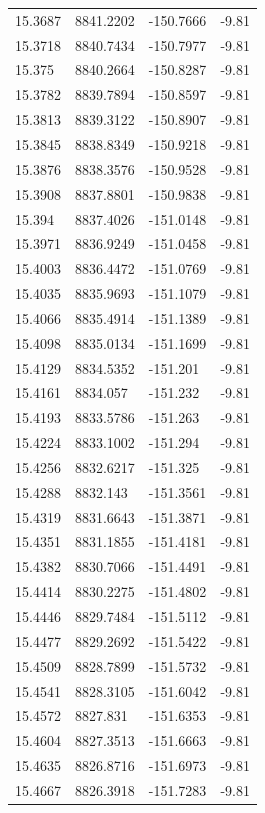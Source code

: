 \begin{table}[H]
\begin{tabular}{llll}
15.3687 & 8841.2202 & -150.7666 & -9.81 \\
15.3718 & 8840.7434 & -150.7977 & -9.81 \\
15.375 & 8840.2664 & -150.8287 & -9.81 \\
15.3782 & 8839.7894 & -150.8597 & -9.81 \\
15.3813 & 8839.3122 & -150.8907 & -9.81 \\
15.3845 & 8838.8349 & -150.9218 & -9.81 \\
15.3876 & 8838.3576 & -150.9528 & -9.81 \\
15.3908 & 8837.8801 & -150.9838 & -9.81 \\
15.394 & 8837.4026 & -151.0148 & -9.81 \\
15.3971 & 8836.9249 & -151.0458 & -9.81 \\
15.4003 & 8836.4472 & -151.0769 & -9.81 \\
15.4035 & 8835.9693 & -151.1079 & -9.81 \\
15.4066 & 8835.4914 & -151.1389 & -9.81 \\
15.4098 & 8835.0134 & -151.1699 & -9.81 \\
15.4129 & 8834.5352 & -151.201 & -9.81 \\
15.4161 & 8834.057 & -151.232 & -9.81 \\
15.4193 & 8833.5786 & -151.263 & -9.81 \\
15.4224 & 8833.1002 & -151.294 & -9.81 \\
15.4256 & 8832.6217 & -151.325 & -9.81 \\
15.4288 & 8832.143 & -151.3561 & -9.81 \\
15.4319 & 8831.6643 & -151.3871 & -9.81 \\
15.4351 & 8831.1855 & -151.4181 & -9.81 \\
15.4382 & 8830.7066 & -151.4491 & -9.81 \\
15.4414 & 8830.2275 & -151.4802 & -9.81 \\
15.4446 & 8829.7484 & -151.5112 & -9.81 \\
15.4477 & 8829.2692 & -151.5422 & -9.81 \\
15.4509 & 8828.7899 & -151.5732 & -9.81 \\
15.4541 & 8828.3105 & -151.6042 & -9.81 \\
15.4572 & 8827.831 & -151.6353 & -9.81 \\
15.4604 & 8827.3513 & -151.6663 & -9.81 \\
15.4635 & 8826.8716 & -151.6973 & -9.81 \\
15.4667 & 8826.3918 & -151.7283 & -9.81 \\

\end{tabular}
\end{table}
